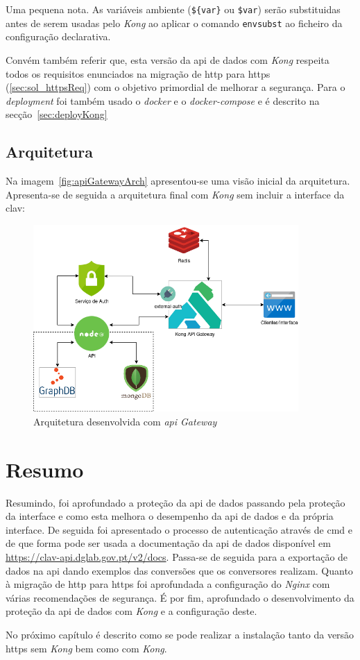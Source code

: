 Uma pequena nota. As variáveis ambiente (\verb|${var}| ou \verb|$var|) serão substituidas antes de serem usadas pelo \textit{Kong} ao aplicar o comando \texttt{envsubst} ao ficheiro da configuração declarativa.

Convém também referir que, esta versão da \acrshort{api} de dados com \textit{Kong} respeita todos os requisitos enunciados na migração de \acrshort{http} para \acrshort{https} (\ref{sec:sol_httpsReq}) com o objetivo primordial de melhorar a segurança. Para o \textit{deployment} foi também usado o \textit{docker} e o \textit{docker-compose} e é descrito na secção~\ref{sec:deployKong}

\subsection{Arquitetura}
Na imagem~\ref{fig:apiGatewayArch} apresentou-se uma visão inicial da arquitetura. Apresenta-se de seguida a arquitetura final com \textit{Kong} sem incluir a interface da \acrshort{clav}: 
\begin{figure}[H]
    \begin{center}
        \includegraphics[width=0.9\textwidth]{img/apiGatewayArchFinal.png}
    \end{center}
    \caption{Arquitetura desenvolvida com \textit{\acrshort{api} Gateway}}\label{fig:apiGatewayArchFinal}
\end{figure}

\section{Resumo}

Resumindo, foi aprofundado a proteção da \acrshort{api} de dados passando pela proteção da interface e como esta melhora o desempenho da \acrshort{api} de dados e da própria interface. De seguida foi apresentado o processo de autenticação através de \acrlong{cmd} e de que forma pode ser usada a documentação da \acrshort{api} de dados disponível em \url{https://clav-api.dglab.gov.pt/v2/docs}. Passa-se de seguida para a exportação de dados na \acrshort{api} dando exemplos das conversões que os conversores realizam. Quanto à migração de \acrshort{http} para \acrshort{https} foi aprofundada a configuração do \textit{Nginx} com várias recomendações de segurança. É por fim, aprofundado o desenvolvimento da proteção da \acrshort{api} de dados com \textit{Kong} e a configuração deste.

No próximo capítulo é descrito como se pode realizar a instalação tanto da versão \acrshort{https} sem \textit{Kong} bem como com \textit{Kong}.
